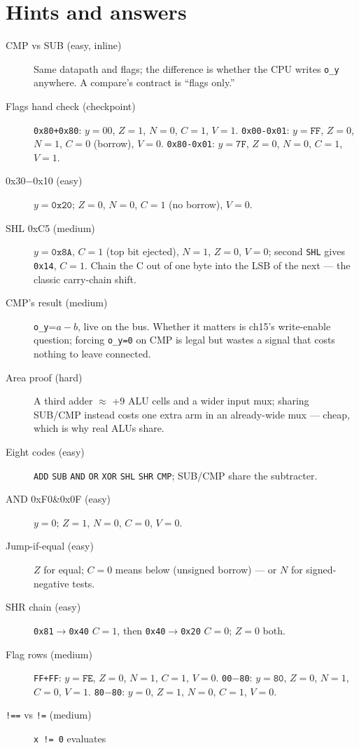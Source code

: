 \section*{Hints and answers}
\begin{description}
\item[CMP vs SUB (easy, inline)] Same datapath and flags; the
difference is whether the CPU writes \texttt{o\_y} anywhere. A
compare's contract is ``flags only.''
\item[Flags hand check (checkpoint)] \texttt{0x80+0x80}: $y=00$, $Z=1$,
$N=0$, $C=1$, $V=1$. \texttt{0x00-0x01}: $y=\texttt{FF}$, $Z=0$,
$N=1$, $C=0$ (borrow), $V=0$. \texttt{0x80-0x01}: $y=\texttt{7F}$,
$Z=0$, $N=0$, $C=1$, $V=1$.
\item[0x30$-$0x10 (easy)] $y=\texttt{0x20}$; $Z=0$, $N=0$, $C=1$
(no borrow), $V=0$.
\item[SHL 0xC5 (medium)] $y=\texttt{0x8A}$, $C=1$ (top bit ejected),
$N=1$, $Z=0$, $V=0$; second \texttt{SHL} gives \texttt{0x14}, $C=1$.
Chain the C out of one byte into the LSB of the next --- the classic
carry-chain shift.
\item[CMP's result (medium)] \texttt{o\_y}=$a-b$, live on the bus.
Whether it matters is ch15's write-enable question; forcing
\texttt{o\_y=0} on CMP is legal but wastes a signal that costs
nothing to leave connected.
\item[Area proof (hard)] A third adder $\approx$ +9 ALU cells and a
wider input mux; sharing SUB/CMP instead costs one extra arm in an
already-wide mux --- cheap, which is why real ALUs share.
\item[Eight codes (easy)] \texttt{ADD} \texttt{SUB} \texttt{AND} \texttt{OR} \texttt{XOR} \texttt{SHL} \texttt{SHR} \texttt{CMP};
SUB/CMP share the subtracter.
\item[AND 0xF0\&0x0F (easy)] $y=0$; $Z=1$, $N=0$, $C=0$, $V=0$.
\item[Jump-if-equal (easy)] $Z$ for equal; $C=0$ means below
(unsigned borrow) --- or $N$ for signed-negative tests.
\item[SHR chain (easy)] \texttt{0x81$\to$0x40} $C=1$, then
\texttt{0x40$\to$0x20} $C=0$; $Z=0$ both.
\item[Flag rows (medium)] \texttt{FF+FF}: $y=\texttt{FE}$, $Z=0$,
$N=1$, $C=1$, $V=0$. \texttt{00$-$80}: $y=\texttt{80}$, $Z=0$, $N=1$,
$C=0$, $V=1$. \texttt{80$-$80}: $y=0$, $Z=1$, $N=0$, $C=1$, $V=0$.
\item[\texttt{!==} vs \texttt{!=} (medium)] \texttt{x != 0} evaluates

\end{description}
